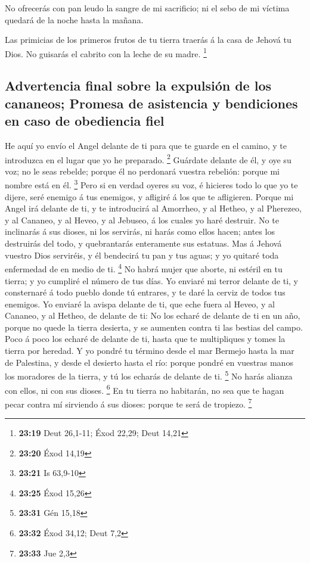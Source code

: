  No ofrecerás con pan leudo la sangre de mi sacrificio;
ni el sebo de mi víctima quedará de la noche hasta la mañana.

 Las primicias de los primeros frutos de tu tierra
traerás á la casa de Jehová tu Dios. No guisarás el cabrito con la leche
de su madre. \footnote{\textbf{23:19} Deut 26,1-11; Éxod 22,29; Deut
  14,21}

\hypertarget{advertencia-final-sobre-la-expulsiuxf3n-de-los-cananeos-promesa-de-asistencia-y-bendiciones-en-caso-de-obediencia-fiel}{%
\subsection{Advertencia final sobre la expulsión de los cananeos;
Promesa de asistencia y bendiciones en caso de obediencia
fiel}\label{advertencia-final-sobre-la-expulsiuxf3n-de-los-cananeos-promesa-de-asistencia-y-bendiciones-en-caso-de-obediencia-fiel}}

 He aquí yo envío el Angel delante de ti para que te
guarde en el camino, y te introduzca en el lugar que yo he preparado.
\footnote{\textbf{23:20} Éxod 14,19}  Guárdate delante de
él, y oye su voz; no le seas rebelde; porque él no perdonará vuestra
rebelión: porque mi nombre está en él. \footnote{\textbf{23:21} Is
  63,9-10}  Pero si en verdad oyeres su voz, é hicieres
todo lo que yo te dijere, seré enemigo á tus enemigos, y afligiré á los
que te afligieren.  Porque mi Angel irá delante de ti, y
te introducirá al Amorrheo, y al Hetheo, y al Pherezeo, y al Cananeo, y
al Heveo, y al Jebuseo, á los cuales yo haré destruir. 
No te inclinarás á sus dioses, ni los servirás, ni harás como ellos
hacen; antes los destruirás del todo, y quebrantarás enteramente sus
estatuas.  Mas á Jehová vuestro Dios serviréis, y él
bendecirá tu pan y tus aguas; y yo quitaré toda enfermedad de en medio
de ti. \footnote{\textbf{23:25} Éxod 15,26}  No habrá
mujer que aborte, ni estéril en tu tierra; y yo cumpliré el número de
tus días.  Yo enviaré mi terror delante de ti, y
consternaré á todo pueblo donde tú entrares, y te daré la cerviz de
todos tus enemigos.  Yo enviaré la avispa delante de ti,
que eche fuera al Heveo, y al Cananeo, y al Hetheo, de delante de ti:
 No los echaré de delante de ti en un año, porque no
quede la tierra desierta, y se aumenten contra ti las bestias del campo.
 Poco á poco los echaré de delante de ti, hasta que te
multipliques y tomes la tierra por heredad.  Y yo pondré
tu término desde el mar Bermejo hasta la mar de Palestina, y desde el
desierto hasta el río: porque pondré en vuestras manos los moradores de
la tierra, y tú los echarás de delante de ti. \footnote{\textbf{23:31}
  Gén 15,18}  No harás alianza con ellos, ni con sus
dioses. \footnote{\textbf{23:32} Éxod 34,12; Deut 7,2} 
En tu tierra no habitarán, no sea que te hagan pecar contra mí sirviendo
á sus dioses: porque te será de tropiezo. \footnote{\textbf{23:33} Jue
  2,3}

